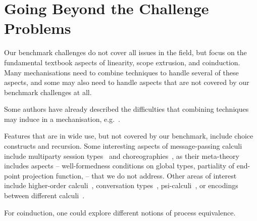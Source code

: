 \documentclass[runningheads]{llncs}
\begin{document}

\section{Going Beyond the Challenge Problems}\label{sec:going-beyond}
Our benchmark challenges do not cover all issues in the field, but focus on the fundamental textbook aspects of linearity, scope extrusion, and coinduction.
Many mechanisations need to combine techniques to handle several of these aspects, and some may also need to handle aspects that are not covered by our benchmark challenges at all.

Some authors have already described the difficulties that combining techniques may induce in a mechanisation, e.g.~\cite{DBLP:conf/forte/ZalakainD21}.

Features that are in wide use, but not covered by our benchmark, include choice constructs and recursion.
Some interesting aspects of message-passing calculi include multiparty session types~\cite{10.1145/2827695} and choreographies~\cite{Carbone2013}, as their meta-theory includes aspects -- \eg well-formedness conditions on global types, partiality of end-point projection function, \etc -- that we do not address.
Other areas of interest include higher-order calculi~\cite{Hirsch2022}, conversation types~\cite{DBLP:journals/tcs/CairesV10}, psi-calculi~\cite{lmcs:696}, or encodings between different calculi~\cite{DBLP:journals/iandc/Gorla10,DBLP:journals/iandc/DardhaGS17}.

For coinduction, one could explore different notions of process equivalence.
\end{document}
